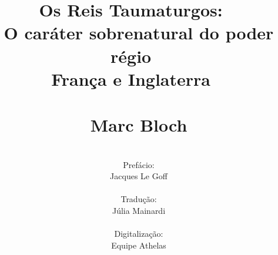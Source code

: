 \documentclass[a5paper]{book}
\begin{document}
\frontmatter
\title{Os Reis Taumaturgos: ~\\O caráter sobrenatural do poder régio ~\\França e Inglaterra ~\\ ~\\Marc Bloch}
\author{\\Prefácio: \\ Jacques Le Goff \\ \\ Tradução: \\ Júlia Mainardi \\ \\Digitalização:\\Equipe Athelas}
\date{}
\maketitle
\end{document}
